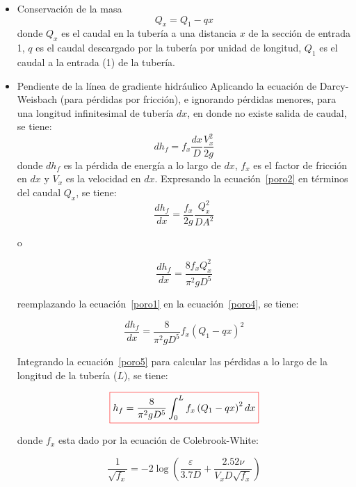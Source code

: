 \documentclass[11pt, oneside]{article}
\begin{document}
\begin{itemize}
\item Conservaci\'on de la masa
\begin{equation}
Q_x = Q_1 - q x
\label{poro1}
\end{equation}
donde $Q_x$ es el caudal en la tuber\'ia a una distancia $x$ de la secci\'on de entrada 1, $q$ es el caudal descargado por la tuber\'ia por unidad de longitud, $Q_1$ es el caudal a la entrada (1) de la tuber\'ia.

\item Pendiente de la l\'inea de gradiente hidr\'aulico
Aplicando la ecuaci\'on de Darcy-Weisbach (para p\'erdidas por fricci\'on), e ignorando p\'erdidas menores,  para una longitud infinitesimal de tuber\'ia $dx$,  en donde no existe salida de caudal, se tiene:
\begin{equation}
d h_f = f_x \frac{dx}{D}\frac{V_x^2}{2g}
\label{poro2}
\end{equation}
donde $d h_f$ es la p\'erdida de energ\'ia a lo largo de $dx$, $f_x$ es el factor de fricci\'on en $dx$ y $V_x$ es la velocidad en $dx$. Expresando la ecuaci\'on~\ref{poro2} en t\'erminos del caudal $Q_x$, se tiene:
\begin{equation}
\frac{d h_f}{dx} = \frac{f_x}{2g}\frac{Q_x^2}{D A^2}
\label{poro3}
\end{equation}

o

\begin{equation}
\frac{d h_f}{dx} = \frac{8 f_x Q_x^2}{\pi^2 g D^5}
\label{poro4}
\end{equation}

reemplazando la ecuaci\'on~\ref{poro1} en la ecuaci\'on~\ref{poro4}, se tiene:

\begin{equation}
\frac{d h_f}{dx} = \frac{8}{\pi^2 g D^5} f_x \left( Q_1 - q x\right)^2
\label{poro5}
\end{equation}

Integrando la ecuaci\'on~\ref{poro5} para calcular las p\'erdidas a lo largo de la longitud de la tuber\'ia ($L$), se tiene:

\begin{equation}
 \color{red}\boxed{\color{black} h_f = \frac{8}{\pi^2 g D^5} \int_0^L f_x \left( Q_1 - q x\right)^2 dx }
\label{poro6}
\end{equation}

donde $f_x$ esta dado por la ecuaci\'on de Colebrook-White:

\begin{equation}
\frac{1}{\sqrt{f_x}}= -2 \log \left( \frac{\varepsilon}{3.7D} + \frac{2.52 \nu}{V_x D \sqrt{f_x}} \right) 
\label{poro7}
\end{equation}


\end{itemize}
\end{document}
